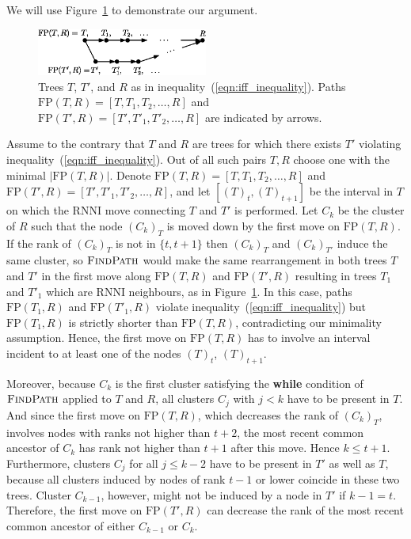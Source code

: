\documentclass[11pt]{amsart}
\newcommand{\rnni}{\mathrm{RNNI}}
\newcommand{\findpath}{\textsc{FindPath}}
\newcommand{\fp}{\mathrm{FP}}
\begin{document}
We will use Figure~\ref{fig:proof_idea} to demonstrate our argument.

\begin{figure}[ht]
\centering
\includegraphics[width=0.5\textwidth]{proof_idea_ag}
\caption{Trees $T$, $T'$, and $R$ as in inequality~(\ref{eqn:iff_inequality}).
Paths $\fp(T,R) = [T,T_1,T_2, \ldots, R]$ and $\fp(T',R) = [T',T'_1,T'_2, \ldots, R]$ are indicated by arrows.}
\label{fig:proof_idea}
\end{figure}

Assume to the contrary that $T$ and $R$ are trees for which there exists $T'$ violating inequality~(\ref{eqn:iff_inequality}).
Out of all such pairs $T, R$ choose one with the minimal $|\fp(T, R)|$.
Denote $\fp(T,R) = [T, T_1, T_2, \ldots, R]$ and $\fp(T', R) = [T', T'_1, T'_2, \ldots, R]$, and let $[(T)_t, (T)_{t+1}]$ be the interval in $T$ on which the $\rnni$ move connecting $T$ and $T'$ is performed.
Let $C_k$ be the cluster of $R$ such that the node $(C_k)_T$ is moved down by the first move on $\fp(T, R)$.
If the rank of $(C_k)_T$ is not in $\{t, t+1\}$ then $(C_k)_T$ and $(C_k)_{T'}$ induce the same cluster, so $\findpath$ would make the same rearrangement in both trees $T$ and $T'$ in the first move along $\fp(T, R)$ and $\fp(T', R)$ resulting in trees $T_1$ and $T'_1$ which are $\rnni$ neighbours, as in Figure~\ref{fig:proof_idea}.
In this case, paths $\fp(T_1, R)$ and $\fp(T'_1, R)$ violate inequality~(\ref{eqn:iff_inequality}) but $\fp(T_1, R)$ is strictly shorter than $\fp(T, R)$, contradicting our minimality assumption.
Hence, the first move on $\fp(T, R)$ has to involve an interval incident to at least one of the nodes $(T)_t$, $(T)_{t+1}$.

Moreover, because $C_k$ is the first cluster satisfying the \textbf{while} condition of $\findpath$ applied to $T$ and $R$, all clusters $C_j$ with $j < k$ have to be present in $T$.
And since the first move on $\fp(T,R)$, which decreases the rank of $(C_k)_T$, involves nodes with ranks not higher than $t+2$, the most recent common ancestor of $C_k$ has rank not higher than $t+1$ after this move.
Hence $k \leq t + 1$.
Furthermore, clusters $C_j$ for all $j \leq k - 2$ have to be present in $T'$ as well as $T$, because all clusters induced by nodes of rank $t - 1$ or lower coincide in these two trees.
Cluster $C_{k-1}$, however, might not be induced by a node in $T'$ if $k-1 = t$.
Therefore, the first move on $\fp(T', R)$ can decrease the rank of the most recent common ancestor of either $C_{k-1}$ or $C_k$.
\end{document}
